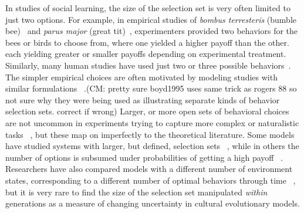 \documentclass[letterpaper,11.5pt]{scrartcl}
\newcommand{\cm}[1]{{\textcolor{mypurple} {({\tiny CM:} #1)}}}
\begin{document}
In studies of social learning, the size of the selection set is very often limited
to just two options.  For example, in empirical studies of \emph{bombus
terresteris} (bumble bee)~\cite{Baracchi2018} and \emph{parus major} (great
tit)~\cite{Aplin2017}, experimenters provided two behaviors for the bees or birds
to choose from, where one yielded a higher payoff than the other. %
each yielding greater or smaller payoffs depending on experimental treatment.
Similarly, many human studies have used just two or three possible
behaviors~\cite{McElreath2005,Toyokawa2019}. The simpler empirical choices are
often motivated by modeling studies with similar formulations ~\cite{boyd1995does,
Rogers1988,perreault2012bayesian}.\cm{pretty sure boyd1995 uses same trick as
rogers 88 so not sure why they were being used as illustrating separate kinds of
behavior selection sets. correct if wrong} Larger, or more open sets of behavioral
choices are not uncommon in experiments trying to capture more complex or
naturalistic tasks ~\cite{derex2013, wasielewski2014}, but these map on
imperfectly to the theoretical literature. Some models have studied systems with
larger, but defined, selection sets ~\cite{Rendell2010}, while in others the
number of options is subsumed under probabilities of getting a high payoff
~\cite{Enquist2007}. Researchers have also compared models with a different number
of environment states, corresponding to a different number of optimal behaviors
through time ~\cite{Feldman1996}, but it is very rare to find the size of the
selection set manipulated \emph{within} generations as a measure of changing
uncertainty in cultural evolutionary models.
\end{document}
